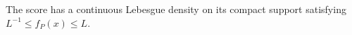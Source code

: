 The score has a continuous Lebesgue density on its compact support satisfying \(L^{-1}\leq f_P(x)\leq L\).
